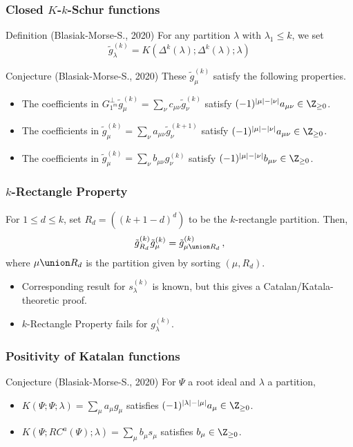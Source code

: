 \documentclass{beamer}
\begin{document}
\begin{frame}
  \frametitle{Closed \(K\)-\(k\)-Schur functions}
  \begin{block}{Definition (Blasiak-Morse-S., 2020)}
    For any partition \(\lambda\) with \(\lambda_1 \leq k\), we set \[
      \tilde{g}^{(k)}_\lambda = K(\Delta^k(\lambda);\Delta^k(\lambda);\lambda)
    \]
  \end{block}\pause
  \begin{block}{Conjecture (Blasiak-Morse-S., 2020)}
    These \(\tilde{g}^{(k)}_\mu\) satisfy the following properties. \pause
    \begin{itemize}
    \item The coefficients in \(G_{1^m}^\perp \tilde{g}_\mu^{(k)}
      = \sum_\nu c_{\mu \nu} \tilde{g}_\nu^{(k)}\) satisfy
      \((-1)^{|\mu|-|\nu|}a_{\mu \nu} \in \Z_{\geq 0}\).\pause
    \item The coefficients in \(\tilde{g}_\mu^{(k)} = \sum_\nu a_{\mu
        \nu} \tilde{g}_\nu^{(k+1)}\) satisfy \((-1)^{|\mu|-|\nu|}
      a_{\mu \nu} \in \Z_{\geq 0}\).\pause
    \item The coefficients in \(\tilde{g}_\mu^{(k)} = \sum_\nu b_{\mu
        \nu} g_\nu^{(k)}\) satisfy \((-1)^{|\mu|-|\nu|} b_{\mu\nu} \in
      \Z_{\geq 0}\).
    \end{itemize}
  \end{block}
\end{frame}
\begin{frame}
  \frametitle{\(k\)-Rectangle Property}
  \begin{theorem}[S. (thesis), 2021]
    For \(1 \leq d \leq k\), set \(R_d = ((k+1-d)^d)\) to be the
    \(k\)-rectangle partition. \pause Then,
    \[
      \tilde{g}_{R_d}^{(k)} \tilde{g}_\mu^{(k)} = \tilde{g}_{\mu
        \union R_d}^{(k)} \,,
    \] 
    where \(\mu \union R_d\) is the partition given by sorting \((\mu,R_d)\).\pause
  \end{theorem}
  \begin{itemize}
  \item Corresponding result for \(s_\lambda^{(k)}\) is known, but
    this gives a Catalan/Katala-theoretic proof.\pause
  \item \(k\)-Rectangle Property fails for \(g_\lambda^{(k)}\).
  \end{itemize}
\end{frame}
\begin{frame}
  \frametitle{Positivity of Katalan functions}
  \begin{block}{Conjecture (Blasiak-Morse-S., 2020)}
    For \(\Psi\) a root ideal and \(\lambda\) a partition,\pause
    \begin{itemize}
    \item \(K(\Psi;\Psi;\lambda) = \sum_\mu a_{\mu}
      g_\mu\) satisfies \((-1)^{|\lambda|-|\mu|} a_{\mu} \in
      \Z_{\geq 0}\).\pause
    \item \(K(\Psi;RC^a(\Psi);\lambda) = \sum_\mu b_{\mu} s_\mu\)
      satisfies \(b_{\mu} \in \Z_{\geq 0}\).
    \end{itemize}
  \end{block}
\end{frame}
\end{document}
